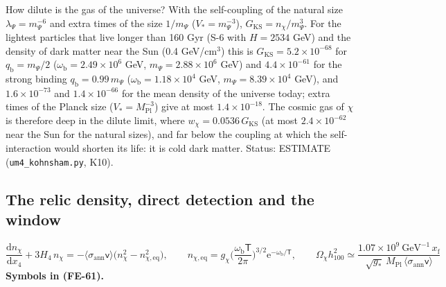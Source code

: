 \documentclass[
  10pt,
]{article}
\begin{document}
How dilute is the gas of the universe? With the self-coupling of the
natural size \(\lambda_\Psi = m_\Psi^{-6}\) and extra times of the size
\(1/m_\Psi\) (\(V_* = m_\Psi^{-3}\)),
\(G_{\mathrm{KS}} = n_\chi/m_\Psi^3\). For the lightest particles that
live longer than 160 Gyr (S-6 with \(H = 2534\) GeV) and the density of
dark matter near the Sun (0.4 GeV/cm\(^3\)) this is
\(G_{\mathrm{KS}} = 5.2\times10^{-68}\) for
\(q_{\mathrm{b}} = m_\Psi/2\) (\(\omega_{\mathrm{b}} = 2.49\times10^6\)
GeV, \(m_\Psi = 2.88\times10^6\) GeV) and \(4.4\times10^{-61}\) for the
strong binding \(q_{\mathrm{b}} = 0.99\,m_\Psi\)
(\(\omega_{\mathrm{b}} = 1.18\times10^4\) GeV,
\(m_\Psi = 8.39\times10^4\) GeV), and \(1.6\times10^{-73}\) and
\(1.4\times10^{-66}\) for the mean density of the universe today; extra
times of the Planck size (\(V_* = M_{\mathrm{Pl}}^{-3}\)) give at most
\(1.4\times10^{-18}\). The cosmic gas of \(\chi\) is therefore deep in
the dilute limit, where \(w_\chi = 0.0536\,G_{\mathrm{KS}}\) (at most
\(2.4\times10^{-62}\) near the Sun for the natural sizes), and far below
the coupling at which the self-interaction would shorten its life: it is
cold dark matter. Status: ESTIMATE (\texttt{um4\_kohnsham.py}, K10).

\hypertarget{the-relic-density-direct-detection-and-the-window}{%
\subsection{The relic density, direct detection and the
window}\label{the-relic-density-direct-detection-and-the-window}}

\[
\frac{\mathrm{d}n_\chi}{\mathrm{d}x_4} + 3H_4\,n_\chi = -\langle\sigma_{\mathrm{ann}}\mathsf{v}\rangle\big(n_\chi^2 - n_{\chi,\mathrm{eq}}^2\big),\qquad
n_{\chi,\mathrm{eq}} = g_\chi\Big(\frac{\omega_{\mathrm{b}}\mathsf{T}}{2\pi}\Big)^{3/2}\mathrm{e}^{-\omega_{\mathrm{b}}/\mathsf{T}},\qquad
\Omega_\chi h_{100}^2 \simeq \frac{1.07\times10^9\ \text{GeV}^{-1}\,x_{\mathrm{f}}}{\sqrt{g_*}\,M_{\mathrm{Pl}}\,\langle\sigma_{\mathrm{ann}}\mathsf{v}\rangle} \tag{FE-61}
\] \textbf{Symbols in (FE-61).}
\end{document}

